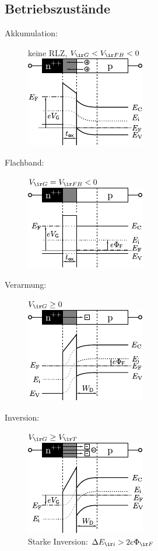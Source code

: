 \documentclass[fs, footer]{latex4ei}
\begin{document}
\begin{multicols*}{4}
\subsection{Betriebszustände}
\begin{description}
	\item[Akkumulation:] keine RLZ, $V_{\ir G} < V_{\ir FB} < 0$\\
		\includegraphics{./img/mos_accumulation.pdf}
	\item[Flachband:] $V_{\ir G} = V_{\ir FB} < 0$\\
		\includegraphics[scale = 0.98]{./img/mos_flatband.pdf}
	\item[Verarmung:] $V_{\ir G} \ge 0$\\
		\includegraphics{./img/mos_depletion.pdf}
	\item[Inversion:] $V_{\ir G} \ge V_{\ir T}$\\
		\includegraphics{./img/mos_inversion.pdf}\\
		Starke Inversion: $\Delta E_{\ir i} > 2 e \Phi_{\ir F}$
\end{description}



\end{multicols*}
\end{document}
